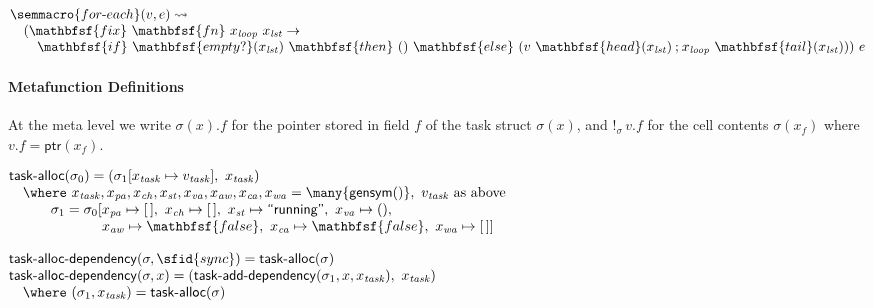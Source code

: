 \vspace{0.75em}
\noindent
$\begin{array}{@{}l@{}}
\semmacro{for\text{-}each}(v, e) \rightsquigarrow \\
\quad (\mathbfsf{fix}\ \mathbfsf{fn}\ x_{\mathit{loop}}\ x_{\mathit{lst}} \to \\
\quad\quad \mathbfsf{if}\ \mathbfsf{empty?}(x_{\mathit{lst}})\
      \mathbfsf{then}\ ()\
      \mathbfsf{else}\ (v\ \mathbfsf{head}(x_{\mathit{lst}}) \mathbin{;}
        x_{\mathit{loop}}\ \mathbfsf{tail}(x_{\mathit{lst}})))\ e
\end{array}$

\paragraph{Metafunction Definitions}
At the meta level we write $\sigma(x).f$ for the pointer stored in field $f$ of the task struct $\sigma(x)$, and $!_{\sigma}\, v.f$ for the cell contents $\sigma(x_f)$ where $v.f = \mathsf{ptr}(x_f)$.

\vspace{0.75em}
\noindent
$\begin{array}{@{}l@{}}
\mathsf{task\text{-}alloc}(\sigma_0) = (\sigma_1[x_{\mathit{task}} \mapsto v_{\mathit{task}}],\ x_{\mathit{task}}) \\
\quad \where\ x_{\mathit{task}}, x_{\mathit{pa}}, x_{\mathit{ch}}, x_{\mathit{st}}, x_{\mathit{va}}, x_{\mathit{aw}}, x_{\mathit{ca}}, x_{\mathit{wa}} = \many{\mathsf{gensym}()},~ v_{\mathit{task}}\ \text{as above} \\
\quad\qquad \sigma_1 = \sigma_0[x_{\mathit{pa}} \mapsto [\,],\ x_{\mathit{ch}} \mapsto [\,],\ x_{\mathit{st}} \mapsto \textsf{``running''},\ x_{\mathit{va}} \mapsto (), \\
\quad\qquad\qquad\quad\ \ x_{\mathit{aw}} \mapsto \mathbfsf{false},\ x_{\mathit{ca}} \mapsto \mathbfsf{false},\ x_{\mathit{wa}} \mapsto [\,]]
\end{array}$

\vspace{0.75em}
\noindent
$\begin{array}{@{}l@{}}
\mathsf{task\text{-}alloc\text{-}dependency}(\sigma, \sfid{sync}) = \mathsf{task\text{-}alloc}(\sigma) \\
\mathsf{task\text{-}alloc\text{-}dependency}(\sigma, x) = (\mathsf{task\text{-}add\text{-}dependency}(\sigma_1, x, x_{\mathit{task}}),\ x_{\mathit{task}}) \\
\quad \where\ (\sigma_1, x_{\mathit{task}}) = \mathsf{task\text{-}alloc}(\sigma)
\end{array}$

